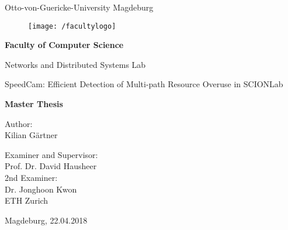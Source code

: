 \documentclass[thesis.tex]{subfiles}
\begin{document}
\thispagestyle {empty}

\begin{center}
\begin{Large}
Otto-von-Guericke-University Magdeburg\\

\begin{figure}
	\centering
	\texttt{[image: /facultylogo]}
	\label{fig:logoinffak}
\end{figure}

\vspace{3mm}


\textbf{Faculty of Computer Science}\\
\end{Large}

\vspace{3mm}

Networks and Distributed Systems Lab\\

\vspace{1cm}
\begin{Huge}
SpeedCam: Efficient Detection of Multi-path Resource Overuse in SCIONLab \\
\end{Huge}
\vspace{15mm}
{\Huge \textbf{Master Thesis}}\\
\vspace{15mm}

Author:\\
\vspace{4mm}
{\huge Kilian G\"{a}rtner}\\

\vspace{16mm}

Examiner and Supervisor:\\
\vspace{2mm}
{\Large Prof. Dr. David Hausheer}\\
\vspace{5mm}
2nd Examiner:\\
\vspace{2mm}
{\Large Dr. Jonghoon Kwon}\\
{ETH Zurich}

\vspace{35mm}

{\large Magdeburg, 22.04.2018}\\

\vspace{40mm}

\end{center}
\clearpage
\end{document}
